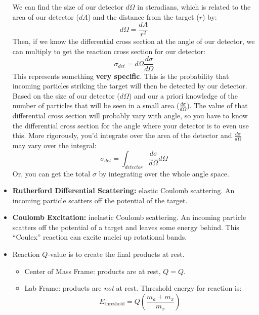 \documentclass[letter]{article}
\begin{document}
\begin{itemize}
We can
    find the size of our detector $d\Omega$ in steradians, which is
    related to the area of our detector ($dA$) and the distance from
    the target ($r$) by:
    \begin{equation*}
      d\Omega = \frac{dA}{r^2}
    \end{equation*}
    Then, if we know the differential cross section at the angle of
    our detector, we can multiply to get the reaction cross section
    for our detector:
    \begin{equation*}
      \sigma_{det} = d\Omega\frac{d\sigma}{d\Omega}
    \end{equation*}
    This represents something \textbf{very specific}. This is the
    probability that incoming particles striking the target will then
    be detected by our detector. Based on the size of our detector
    ($d\Omega$) and our a priori knowledge of the number of particles
    that will be seen in a small area ($\frac{d\sigma}{d\Omega}$). The
    value of that differential cross section will probably vary with
    angle, so you have to know the differential cross section for the
    angle where your detector is to even use this. More rigorously,
    you'd integrate over the area of the detector and
    $\frac{d\sigma}{d\Omega}$ may vary over the integral:
    \begin{equation*}
      \sigma_{det} = \int_{detector}\frac{d\sigma}{d\Omega}d\Omega
    \end{equation*}
    Or, you can get the total $\sigma$ by integrating over the whole
    angle space.
\item \textbf{Rutherford Differential Scattering:} elastic Coulomb
  scattering. An incoming particle scatters off the potential of the
  target.~\cite[Lec 24]{lecture}
\item \textbf{Coulomb Excitation:} inelastic Coulomb scattering. An
  incoming particle scatters off the potential of a target and leaves
  some energy behind. This ``Coulex'' reaction can excite nuclei up
  rotational bands.~\cite[Lec. 24]{lecture}
\item Reaction $Q$-value is to create the final products at rest.
  \begin{itemize}
  \item Center of Mass Frame: products are at rest, $Q = Q$.
  \item Lab Frame: products are \textit{not} at rest. Threshold energy
    for reaction is:
    \begin{equation*}
      E_{\text{threshold}}=Q\left(\frac{m_a+m_x}{m_x}\right)

\end{equation*}
\end{itemize}
\end{itemize}
\end{document}
